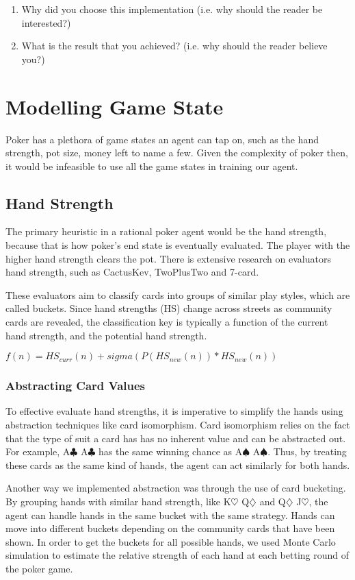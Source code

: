 \documentclass{article}
\begin{document}
\begin{enumerate}
	\item Why did you choose this implementation (i.e. why should the reader be interested?)
	\item What is the result that you achieved? (i.e. why should the reader believe you?)
\end{enumerate}

\section{Modelling Game State}
Poker has a plethora of game states an agent can tap on, such as the hand strength, pot size, money left to name a few. Given the complexity of poker then, it would be infeasible to use all the game states in training our agent.

\subsection{Hand Strength}
The primary heuristic in a rational poker agent would be the hand strength, because that is how poker's end state is eventually evaluated. The player with the higher hand strength clears the pot. There is extensive research on evaluators hand strength, such as CactusKev, TwoPlusTwo and 7-card.

These evaluators aim to classify cards into groups of similar play styles, which are called buckets. Since hand strengths (HS) change across streets as community cards are revealed, the classification key is typically a function of the current hand strength, and the potential hand strength.

$f(n) = HS_{curr}(n) + sigma(P(HS_{new}(n)) * HS_{new}(n))$

\subsubsection{Abstracting Card Values}
To effective evaluate hand strengths, it is imperative to simplify the hands using abstraction techniques like card isomorphism. Card isomorphism relies on the fact that the type of suit a card has has no inherent value and can be abstracted out. For example, A$\clubsuit$ A$\clubsuit$ has the same winning chance as A$\spadesuit$ A$\spadesuit$. Thus, by treating these cards as the same kind of hands, the agent can act similarly for both hands.

Another way we implemented abstraction was through the use of card 
bucketing. By grouping hands with similar hand strength, like 
K$\heartsuit$ Q$\diamondsuit$ and Q$\diamondsuit$ J$\heartsuit$, the 
agent can handle hands in the same bucket with the same strategy. 
Hands can move into different buckets depending on the community 
cards that have been shown. In order to get the buckets for all 
possible hands, we used Monte Carlo simulation to estimate the 
relative strength of each hand at each betting round of the poker 
game.
\end{document}
